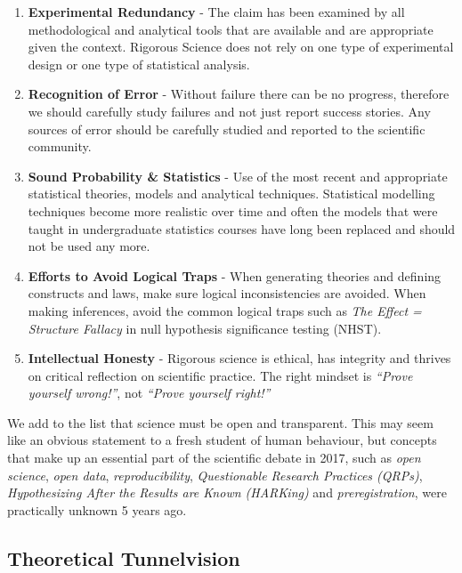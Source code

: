 \documentclass[12pt,]{book}
\providecommand{\tightlist}{%
  \setlength{\itemsep}{0pt}\setlength{\parskip}{0pt}}
\begin{document}
\begin{enumerate}
\def\labelenumi{\arabic{enumi}.}
\tightlist
\item
  \textbf{Experimental Redundancy} - The claim has been examined by all methodological and analytical tools that are available and are appropriate given the context. Rigorous Science does not rely on one type of experimental design or one type of statistical analysis.
\item
  \textbf{Recognition of Error} - Without failure there can be no progress, therefore we should carefully study failures and not just report success stories. Any sources of error should be carefully studied and reported to the scientific community.
\item
  \textbf{Sound Probability \& Statistics} - Use of the most recent and appropriate statistical theories, models and analytical techniques. Statistical modelling techniques become more realistic over time and often the models that were taught in undergraduate statistics courses have long been replaced and should not be used any more.
\item
  \textbf{Efforts to Avoid Logical Traps} - When generating theories and defining constructs and laws, make sure logical inconsistencies are avoided. When making inferences, avoid the common logical traps such as \emph{The Effect = Structure Fallacy} in null hypothesis significance testing (NHST).
\item
  \textbf{Intellectual Honesty} - Rigorous science is ethical, has integrity and thrives on critical reflection on scientific practice. The right mindset is \emph{``Prove yourself wrong!''}, not \emph{``Prove yourself right!''}
\end{enumerate}

We add to the list that science must be open and transparent. This may seem like an obvious statement to a fresh student of human behaviour, but concepts that make up an essential part of the scientific debate in 2017, such as \emph{open science}, \emph{open data}, \emph{reproducibility}, \emph{Questionable Research Practices (QRPs)}, \emph{Hypothesizing After the Results are Known (HARKing)} and \emph{preregistration}, were practically unknown 5 years ago.

\hypertarget{theoretical-tunnelvision}{%
\subsection*{Theoretical Tunnelvision}\label{theoretical-tunnelvision}}
\end{document}
